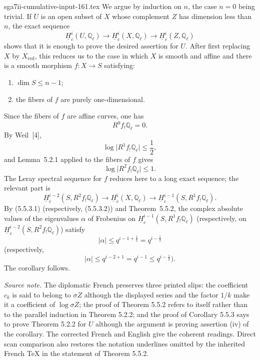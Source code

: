 \begin{filecontents*}{sga7ii-cumulative-input-161.tex}
We argue by induction on $n$, the case $n=0$ being trivial.  If $U$ is an
open subset of $X$ whose complement $Z$ has dimension less than $n$, the
exact sequence
\[
\underline H_c^i(U,\mathbb Q_\ell)\longrightarrow
\underline H_c^i(X,\mathbb Q_\ell)\longrightarrow
\underline H_c^i(Z,\mathbb Q_\ell)
\]
shows that it is enough to prove the desired assertion for $U$.  After
first replacing $X$ by $X_{\mathrm{red}}$, this reduces us to the case in
which $X$ is smooth and affine and there is a smooth morphism
$f:X\longrightarrow S$ satisfying:
\begin{enumerate}[label=(\alph*)]
\item $\dim S\leq n-1$;
\item the fibers of $f$ are purely one-dimensional.
\end{enumerate}
Since the fibers of $f$ are affine curves, one has
\[
R^0f_!\mathbb Q_\ell=0.
\]
By Weil~[4],
\begin{equation}\tag{5.5.3.1}
\log\bigl|R^1f_!\mathbb Q_\ell\bigr|\leq\frac12,
\end{equation}
and Lemma~5.2.1 applied to the fibers of $f$ gives
\begin{equation}\tag{5.5.3.2}
\log\bigl|R^2f_!\mathbb Q_\ell\bigr|\leq1.
\end{equation}
The Leray spectral sequence for $f$ reduces here to a long exact sequence;
the relevant part is
\[
\underline H_c^{i-2}(S,R^2f_!\mathbb Q_\ell)\longrightarrow
\underline H_c^i(X,\mathbb Q_\ell)\longrightarrow
\underline H_c^{i-1}(S,R^1f_!\mathbb Q_\ell).
\]
By (5.5.3.1) (respectively, (5.5.3.2)) and Theorem~5.5.2, the complex
absolute values of the eigenvalues $\alpha$ of Frobenius on
$\underline H_c^{i-1}(S,R^1f_!\mathbb Q_\ell)$ (respectively, on
$\underline H_c^{i-2}(S,R^2f_!\mathbb Q_\ell)$) satisfy
\[
|\alpha|\leq q^{i-1+\frac12}=q^{i-\frac12}
\]
(respectively,
\[
|\alpha|\leq q^{i-2+1}=q^{i-1}\leq q^{i-\frac12}).
\]
The corollary follows.

\medskip
\noindent\emph{Source note.}
The diplomatic French preserves three printed slips: the coefficient
$c_k$ is said to belong to $\sigma Z$ although the displayed series and
the factor $1/k$ make it a coefficient of $\log\sigma Z$; the proof of
Theorem 5.5.2 refers to itself rather than to the parallel induction in
Theorem 5.2.2; and the proof of Corollary 5.5.3 says to prove Theorem 5.2.2
for $U$ although the argument is proving assertion (iv) of the corollary.
The corrected French and English give the coherent readings.  Direct scan
comparison also restores the notation underlines omitted by the inherited
French TeX in the statement of Theorem 5.5.2.
\end{filecontents*}
